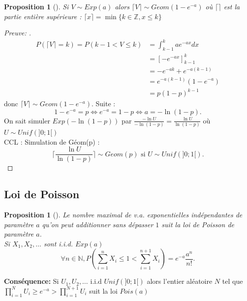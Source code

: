 \documentclass{article}
\theoremstyle{plain}%
\newtheorem{prop}[thm]{Proposition}
\theoremstyle{definition}
\theoremstyle{remark}
\begin{document}
\begin{prop}[]
	Si $ V \sim Exp(a) $ alors $ \lceil V \rceil \sim Geom(1-e^{-a})$ où $ \lceil \rceil $ est la partie entière supérieure : $ \lceil x \rceil = \min \{k \in \mathbb{Z}, x \leq k\}$ 
\end{prop}
\begin{proof}[Preuve: ]
	\begin{align*}
		P(\lceil V \rceil = k) = P(k-1 < V \leq k) &= \int_{k-1}^{k}ae^{-ax}dx \\
		&= [-e^{-ax}]_{k-1}^k \\
		&= -e^{-ak} + e^{-a(k-1)} \\
		&= e^{-a(k-1)} (1-e^{-a}) \\
		&= p(1-p)^{k-1}
	\end{align*}
	donc $ \lceil V \rceil \sim Geom(1-e^{-a}) $. Suite :
	\[
		1-e^{-a} = p \Leftrightarrow e^{-a} = 1-p \Leftrightarrow a = -\ln (1-p)
	.\]
	On sait simuler $ Exp(-\ln (1-p)) $ par $ \frac{-\ln U}{-\ln (1-p)} = \frac{\ln U}{\ln (1-p)} $ où $ U \sim Unif(]0;1[) $ \\
	CCL : Simulation de Géom(p) : 
	\[
		\lceil \frac{\ln U}{\ln (1-p)} \rceil \sim Geom(p) \text{ si } U \sim Unif(]0;1[)
	.\]
\end{proof}

\subsection{Loi de Poisson}

\begin{prop}[]
	Le nombre maximal de v.a. exponentielles indépendantes de paramètre $ a $ qu'on peut additionner sans dépasser $ 1 $ suit la loi de Poisson de paramètre $ a $. \\
	Si $ X_1, X_2, \dots $ sont i.i.d. $ Exp(a) $ 
	\[
		\forall n \in \mathbb{N}, P(\sum_{i=1}^{n}X_i \leq 1 < \sum_{i=1}^{n+1}X_i) = e^{-a}\frac{a^n}{n!}
	.\]
\end{prop}
\textbf{Conséquence:} Si $ U_1, U_2, \dots $ i.i.d $ Unif(]0;1[) $ alors l'entier aléatoire $ N $ tel que $ \prod_{i=1}^{N}U_i \geq e^{-a} > \prod_{i=1}^{N+1}U_i $ suit la loi $ Pois(a) $ \\
\end{document}
